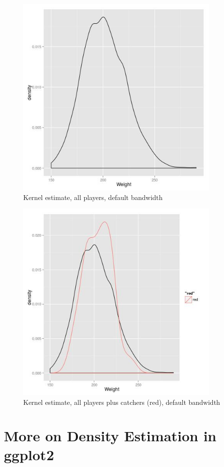 \begin{figure}[tb] 
\centerline{
\includegraphics[width=4.0in]{BaseballWtAll.jpg} 
}
\caption{Kernel estimate, all players, default bandwidth}
\label{b3}  

\end{figure}

\begin{figure}[tb] 
\centerline{
\includegraphics[width=4.0in]{BaseballWtAllPlusCatchers.jpg} 
}
\caption{Kernel estimate, all players plus catchers (red), default bandwidth}
\label{b4}  
\end{figure}

\section{More on Density Estimation in ggplot2}

